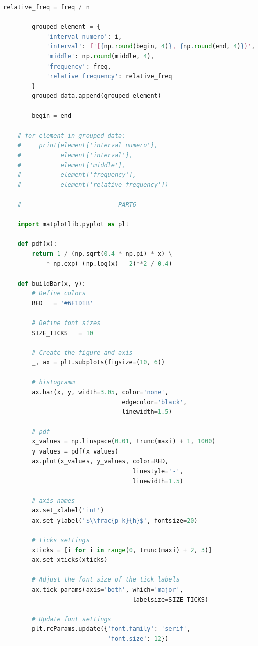 \documentclass[a4paper, 14pt]{extarticle}
\begin{document}
\begin{center}
\begin{lstlisting}[language=Python]
        relative_freq = freq / n

        grouped_element = {
            'interval numero': i,
            'interval': f'[{np.round(begin, 4)}, {np.round(end, 4)})',
            'middle': np.round(middle, 4),
            'frequency': freq,
            'relative frequency': relative_freq
        }
        grouped_data.append(grouped_element)

        begin = end

    # for element in grouped_data:
    #     print(element['interval numero'], 
    #           element['interval'], 
    #           element['middle'], 
    #           element['frequency'], 
    #           element['relative frequency'])

    # --------------------------PART6--------------------------

    import matplotlib.pyplot as plt

    def pdf(x):
        return 1 / (np.sqrt(0.4 * np.pi) * x) \
            * np.exp(-(np.log(x) - 2)**2 / 0.4)

    def buildBar(x, y):
        # Define colors
        RED   = '#6F1D1B'

        # Define font sizes
        SIZE_TICKS   = 10

        # Create the figure and axis
        _, ax = plt.subplots(figsize=(10, 6))

        # histogramm
        ax.bar(x, y, width=3.05, color='none', 
                                 edgecolor='black', 
                                 linewidth=1.5)

        # pdf
        x_values = np.linspace(0.01, trunc(maxi) + 1, 1000)
        y_values = pdf(x_values)
        ax.plot(x_values, y_values, color=RED, 
                                    linestyle='-', 
                                    linewidth=1.5)

        # axis names
        ax.set_xlabel('int')
        ax.set_ylabel('$\\frac{p_k}{h}$', fontsize=20)

        # ticks settings
        xticks = [i for i in range(0, trunc(maxi) + 2, 3)]
        ax.set_xticks(xticks)

        # Adjust the font size of the tick labels
        ax.tick_params(axis='both', which='major', 
                                    labelsize=SIZE_TICKS)

        # Update font settings
        plt.rcParams.update({'font.family': 'serif', 
                             'font.size': 12})


\end{lstlisting}
\end{center}
\end{document}
